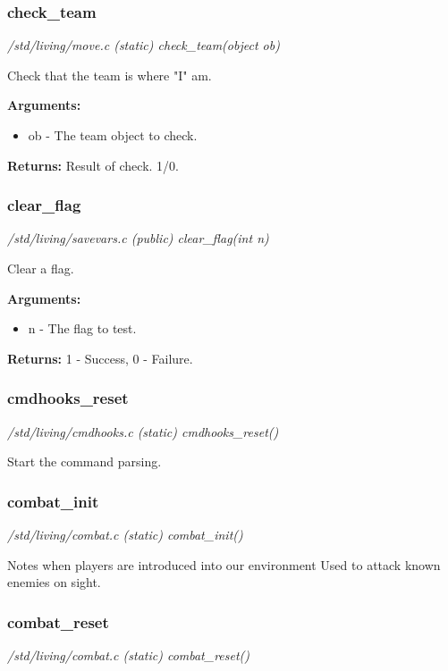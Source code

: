 \subsubsection{check\_team}

{\em /std/living/move.c (static) check\_team(object ob)}

Check that the team is where "I" am.

{\bf Arguments:}
\begin{itemize}
\item      ob - The team object to check.
\end{itemize}

{\bf Returns:}        Result of check. 1/0.


\subsubsection{clear\_flag}

{\em /std/living/savevars.c (public) clear\_flag(int n)}

Clear a flag.

{\bf Arguments:}
\begin{itemize}
\item      n - The flag to test.
\end{itemize}

{\bf Returns:}        1 - Success, 0 - Failure.


\subsubsection{cmdhooks\_reset}

{\em /std/living/cmdhooks.c (static) cmdhooks\_reset()}

Start the command parsing.


\subsubsection{combat\_init}

{\em /std/living/combat.c (static) combat\_init()}

Notes when players are introduced into our environment
Used to attack known enemies on sight.


\subsubsection{combat\_reset}

{\em /std/living/combat.c (static) combat\_reset()}


